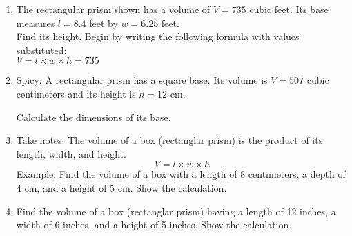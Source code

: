 \begin{enumerate}
\item The rectangular prism shown has a volume of $V=735$ cubic feet. Its base measures $l=8.4$ feet by $w=6.25$ feet. \\[0.5cm]
Find its height. Begin by writing the following formula with values substituted: \\[0.5cm]
$V = l \times w \times h = 735$
\begin{flushright}
\end{flushright}

\item Spicy: A rectangular prism has a square base. Its volume is $V=507$ cubic centimeters and its height is $h=12$ cm.
  \begin{multicols}{2}
    Calculate the dimensions of its base.
    \begin{flushright}
    \end{flushright}
  \end{multicols}


\item Take notes: The volume of a box (rectanglar prism) is the product of its length, width, and height.
$$V = l \times w \times h$$
Example: Find the volume of a box with a length of 8 centimeters, a depth of 4 cm, and a height of 5 cm. Show the calculation.
\begin{flushright}
  \end{flushright} \vspace{2cm} 

\item Find the volume of a box (rectanglar prism) having a length of 12 inches, a width of 6 inches, and a height of 5 inches. Show the calculation.


\end{enumerate}
